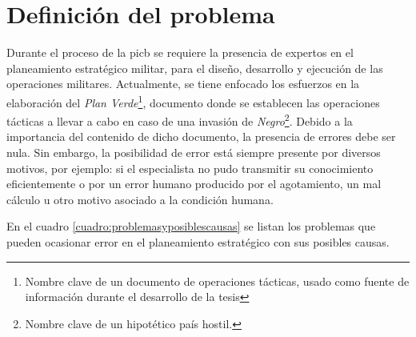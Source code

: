 \section{Definición del problema}

Durante el proceso de la \gls{picb} se requiere la presencia de expertos en el planeamiento estratégico militar, para el diseño, desarrollo y ejecución de las operaciones militares. Actualmente, se tiene enfocado los esfuerzos en la elaboración del \emph{Plan Verde}\footnote{Nombre clave de un documento de operaciones tácticas, usado como fuente de información durante el desarrollo de la tesis}, documento donde se establecen las operaciones tácticas a llevar a cabo en caso de una invasión de \emph{Negro}\footnote{Nombre clave de un hipotético país hostil.}. Debido a la importancia del contenido de dicho documento, la presencia de errores debe ser nula. Sin embargo, la posibilidad de error está siempre presente por diversos motivos, por ejemplo: si el especialista no pudo transmitir su conocimiento eficientemente o por un error humano producido por el agotamiento, un mal cálculo u otro motivo asociado a la condición humana.

En el cuadro \ref{cuadro:problemasyposiblescausas} se listan los problemas que pueden ocasionar error en el planeamiento estratégico con sus posibles causas.

